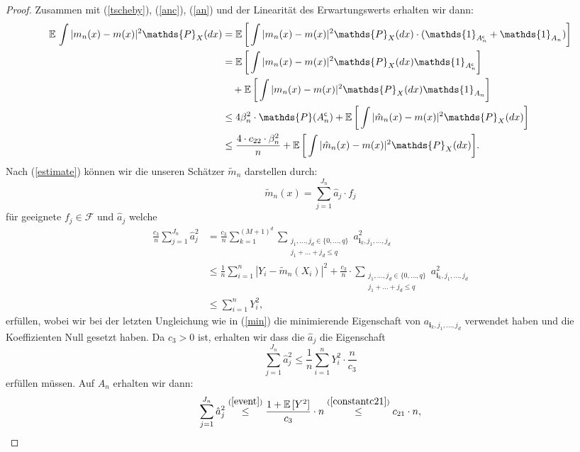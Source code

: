 \begin{proof}
Zusammen mit (\ref{tscheby}), (\ref{anc}), (\ref{an}) und der Linearität des Erwartungswerts erhalten wir dann$\colon$
\begin{equation*}
\begin{split}
\E \int |m_n(x) - m(x)|^2 \mathds{P}_X(dx) & = \E \bigg[\int |m_n(x) - m(x)|^2 \mathds{P}_X(dx) \cdot (\mathds{1}_{A_n^{\mathsf{c}}} + \mathds{1}_{A_n})\bigg] \\
& = \E \bigg[\int |m_n(x) - m(x)|^2 \mathds{P}_X(dx) \mathds{1}_{A_n^{\mathsf{c}}}\bigg] \\
& \quad + \E \bigg[\int |m_n(x) - m(x)|^2 \mathds{P}_X(dx) \mathds{1}_{A_n}\bigg] \\
& \leq 4\beta_n^2 \cdot \mathds{P}(A_n^{\mathsf{c}}) + \E \bigg[\int |\hat{m}_n(x) - m(x)|^2 \mathds{P}_X(dx)\bigg] \\
& \leq \frac{4 \cdot c_{22} \cdot \beta_n^2}{n} + \E \bigg[\int |\hat{m}_n(x) - m(x)|^2 \mathds{P}_X(dx)\bigg].
\end{split}
\end{equation*}
Nach (\ref{estimate}) können wir die unseren Schätzer $\tilde{m}_n$ darstellen durch$\colon$
$$\tilde{m}_n(x) = \sum_{j = 1}^{J_n}\hat{a}_j \cdot f_j$$
für geeignete $f_j \in \mathcal{F}$ und $\hat{a}_j$ welche 
\begin{equation*}
\begin{split}
\frac{c_3}{n}\sum_{j = 1}^{J_n} \hat{a}_j^2 & = \frac{c_3}{n} \sum_{k = 1}^{(M + 1)^d} \sum_{\substack{ j_1,\dots,j_d \in \{0,\dots,q\} \\j_1+\dots +j_d \leq q}} a_{\mathbf{i}_k,j_1,\dots,j_d}^2 \\
& \leq \frac{1}{n} \sum_{i = 1}^n|Y_i - \tilde{m}_n(X_i)|^2 + \frac{c_3}{n} \cdot \sum_{\substack{ j_1,\dots,j_d \in \{0,\dots,q\} \\j_1+\dots +j_d \leq q}} a_{\mathbf{i}_k,j_1,\dots,j_d}^2 \\
& \leq \sum_{i = 1}^n Y_i^2,
\end{split}
\end{equation*}
erfüllen, wobei wir bei der letzten Ungleichung wie in (\ref{min}) die minimierende Eigenschaft von $a_{\mathbf{i}_k,j_1,\dots,j_d}$ verwendet haben und die Koeffizienten Null gesetzt haben.  Da $c_3 > 0$ ist, erhalten wir dass die $\hat{a}_j$ die Eigenschaft
$$\sum_{j = 1}^{J_n} \hat{a}_j^2  \leq \frac{1}{n}\sum_{i = 1}^n Y_i^2 \cdot \frac{n}{c_3}$$
erfüllen müssen.
Auf $A_n$ erhalten wir dann$\colon$
$$\sum_{j = 1}^{J_n}\hat{a}_j^2 \stackrel{(\ref{event})}{\leq} \frac{1 + \mathbb{E}\,[Y^2]}{c_3} \cdot n \stackrel{(\ref{constantc21})}{\leq} c_{21} \cdot n,$$

\end{proof}
